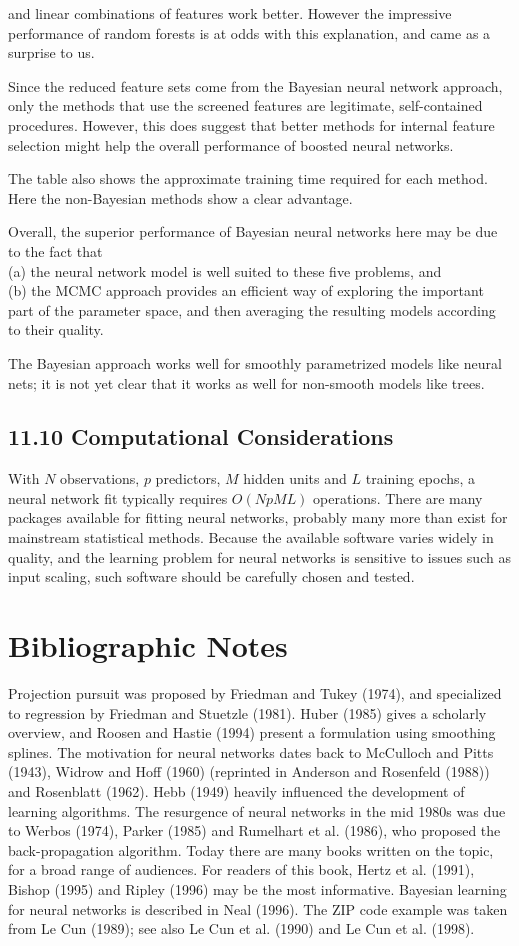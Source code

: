 \documentclass[10pt]{article}
\begin{document}
and linear combinations of features work better. However the impressive performance of random forests is at odds with this explanation, and came as a surprise to us.

Since the reduced feature sets come from the Bayesian neural network approach, only the methods that use the screened features are legitimate, self-contained procedures. However, this does suggest that better methods for internal feature selection might help the overall performance of boosted neural networks.

The table also shows the approximate training time required for each method. Here the non-Bayesian methods show a clear advantage.

Overall, the superior performance of Bayesian neural networks here may be due to the fact that\\
(a) the neural network model is well suited to these five problems, and\\
(b) the MCMC approach provides an efficient way of exploring the important part of the parameter space, and then averaging the resulting models according to their quality.

The Bayesian approach works well for smoothly parametrized models like neural nets; it is not yet clear that it works as well for non-smooth models like trees.

\subsection*{11.10 Computational Considerations}
With $N$ observations, $p$ predictors, $M$ hidden units and $L$ training epochs, a neural network fit typically requires $O(N p M L)$ operations. There are many packages available for fitting neural networks, probably many more than exist for mainstream statistical methods. Because the available software varies widely in quality, and the learning problem for neural networks is sensitive to issues such as input scaling, such software should be carefully chosen and tested.

\section*{Bibliographic Notes}
Projection pursuit was proposed by Friedman and Tukey (1974), and specialized to regression by Friedman and Stuetzle (1981). Huber (1985) gives a scholarly overview, and Roosen and Hastie (1994) present a formulation using smoothing splines. The motivation for neural networks dates back to McCulloch and Pitts (1943), Widrow and Hoff (1960) (reprinted in Anderson and Rosenfeld (1988)) and Rosenblatt (1962). Hebb (1949) heavily influenced the development of learning algorithms. The resurgence of neural networks in the mid 1980s was due to Werbos (1974), Parker (1985) and Rumelhart et al. (1986), who proposed the back-propagation algorithm. Today there are many books written on the topic, for a broad range of audiences. For readers of this book, Hertz et al. (1991), Bishop (1995) and Ripley (1996) may be the most informative. Bayesian learning for neural networks is described in Neal (1996). The ZIP code example was taken from Le Cun (1989); see also Le Cun et al. (1990) and Le Cun et al. (1998).
\end{document}
